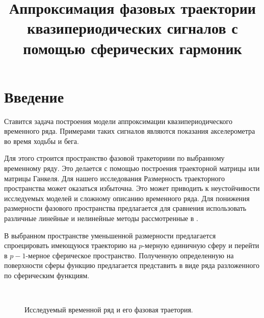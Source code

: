 \documentclass[12pt,twoside]{article}
\title
    [Аппроксимация фазовой траектории] 
    {Аппроксимация фазовых траектории квазипериодических сигналов с помощью сферических гармоник}
\begin{document}
\newcommand{\nsymbol}[2]{\medskip\hangindent=\parindent\hangafter=1\noindent $#1$ --- #2\par}
\newcommand{\nsymbolp}[3]{\nsymbol{#1}{#2 \dotfill\pageref{#3}}}

\newcommand{\hookuparrow}{\mathrel{\rotatebox[origin=t]{270}{$\hookleftarrow$}}}
\newcommand{\hookdownarrow}{\mathrel{\rotatebox[origin=t]{90}{$\hookleftarrow$}}}

\maketitle

\section{Введение}
Ставится задача построения модели аппроксимации квазипериодического временного ряда. Примерами таких сигналов являются показания акселерометра во время ходьбы и бега.
	
Для этого строится пространство фазовой тракеториии по выбранному временному ряду.  Это делается с помощью построения траекторной матрицы или матрицы Ганкеля.
Для нашего исследования 
Размерность траекторного пространства может оказаться избыточна. Это может приводить к неустойчивости исследуемых моделей и сложному описанию временного ряда. Для понижения размерности фазового пространства предлагается для сравнения использовать  различные линейные и нелинейные методы рассмотренные в \cite{Maaten2007}.
	
В выбранном пространстве уменьшенной размерности предлагается спроецировать имеющуюся траекторию на $p$-мерную единичную сферу и перейти в $p-1$-мерное сферическое пространство. Полученную определенную на поверхности сферы функцию предлагается представить в виде ряда разложенного по сферическим функциям.

\begin{figure}[h]
\centering
  \\
\caption{Исследуемый временной ряд и его фазовая траетория. }
\label{fg:initial_traj}
\end{figure}
\end{document}
